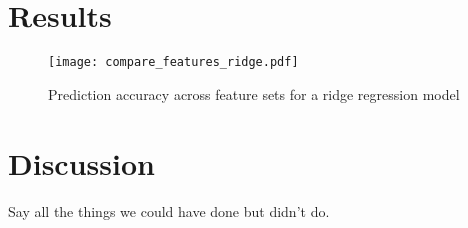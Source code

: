 \documentclass[10pt,conference,compsocconf]{IEEEtran}
\begin{document}
\section{Results}
\label{sec:results}

\begin{figure}
	\texttt{[image: compare\_features\_ridge.pdf]}
	\caption{Prediction accuracy across feature sets for a ridge regression model}
	\vspace*{-5mm}
	\setlength{\belowcaptionskip}{-10pt}
\end{figure}

\section{Discussion}
Say all the things we could have done but didn't do.



\end{document}
